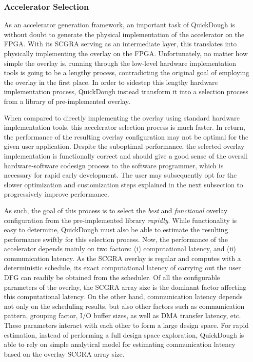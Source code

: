 \subsubsection{Accelerator Selection}
As an accelerator generation framework, an important task of QuickDough is without doubt to generate the physical implementation of the accelerator on the FPGA.
With its SCGRA serving as an intermediate layer, this translates into physically implementing the overlay on the FPGA.
Unfortunately, no matter how simple the overlay is, running through the low-level hardware implementation tools is going to be a lengthy process, contradicting the original goal of employing the overlay in the first place.
In order to sidestep this lengthy hardware implementation process, QuickDough instead transform it into a selection process from a library of pre-implemented overlay.

When compared to directly implementing the overlay using standard hardware implementation tools, this accelerator selection process is much faster.
In return, the performance of the resulting overlay configuration may not be optimal for the given user application.
Despite the suboptimal performance, the selected overlay implementation is functionally correct and should give a good sense of the overall hardware-software codesign process to the software programmer, which is necessary for rapid early development.
The user may subsequently opt for the slower optimization and customization steps explained in the next subsection to progressively improve performance.

As such, the goal of this process is to select the \emph{best} and \emph{functional} overlay configuration from the pre-implemented library \emph{rapidly}.
While functionality is easy to determine, QuickDough must also be able to estimate the resulting performance swiftly for this selection process.
Now, the performance of the accelerator depends mainly on two factors: (i) computational latency, and (ii) communication latency.
As the SCGRA overlay is regular and computes with a deterministic schedule, its exact computational latency of carrying out the user DFG can readily be obtained from the scheduler.
Of all the configurable parameters of the overlay, the SCGRA array size is the dominant factor affecting this computational latency.
On the other hand, communication latency depends not only on the scheduling results, but also other factors such as communication pattern, grouping factor, I/O buffer sizes, as well as DMA transfer latency, etc.
These parameters interact with each other to form a large design space.
For rapid estimation, instead of performing a full design space exploration, QuickDough is able to rely on simple analytical model for estimating communication latency based on the overlay SCGRA array size.

